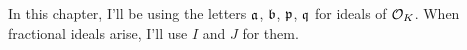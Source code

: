 
\begin{remark}
	In this chapter, I'll be using the letters $\mathfrak a$, $\mathfrak b$, $\mathfrak p$, $\mathfrak q$
	for ideals of $\mathcal O_K$.
	When fractional ideals arise, I'll use $I$ and $J$ for them.
\end{remark}

